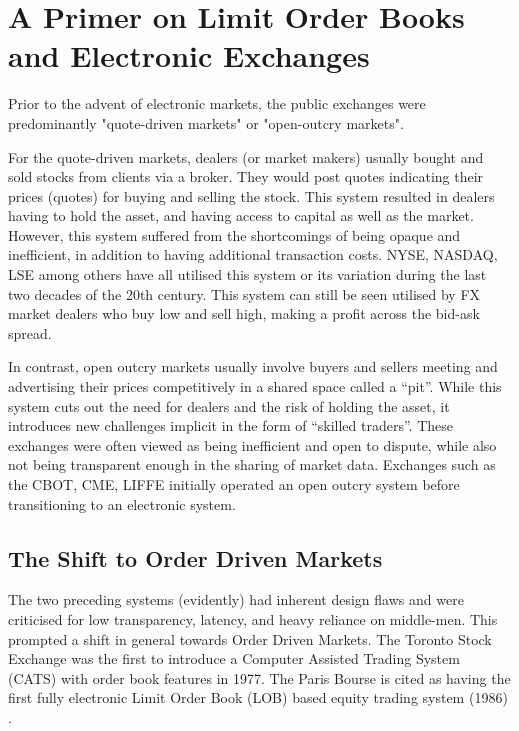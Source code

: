 \hspace{3mm}
\chapter{A Primer on Limit Order Books and Electronic Exchanges}

Prior to the advent of electronic markets, the public exchanges were predominantly "quote-driven markets" or "open-outcry markets".

For the quote-driven markets, dealers (or market makers) usually bought and sold stocks from clients via a broker. They would post quotes indicating their prices (quotes) for buying and selling the stock. This system resulted in dealers having to hold the asset, and having access to capital as well as the market. However, this system suffered from the shortcomings of being opaque and inefficient, in addition to having additional transaction costs. NYSE, NASDAQ, LSE among others have all utilised this system or its variation during the last two decades of the 20th century. This system can still be seen utilised by FX market dealers who buy low and sell high, making a profit across the bid-ask spread.

In contrast, open outcry markets usually involve buyers and sellers meeting and advertising their prices competitively in a shared space called a ``pit''. While this system cuts out the need for dealers and the risk of holding the asset, it introduces new challenges implicit in the form of ``skilled traders''. These exchanges were often viewed as being inefficient and open to dispute, while also not being transparent enough in the sharing of market data. Exchanges such as the CBOT, CME, LIFFE initially operated an open outcry system before transitioning to an electronic system.

\section{The Shift to Order Driven Markets}
The two preceding systems (evidently) had inherent design flaws and were criticised for low transparency, latency, and heavy reliance on middle-men. This prompted a shift in general towards Order Driven Markets. The Toronto Stock Exchange was the first to introduce a Computer Assisted Trading System (CATS) with order book features in 1977. The Paris Bourse is cited as having the first fully electronic Limit Order Book (LOB) based equity trading system (1986)
\cite{Abergel2016}.

